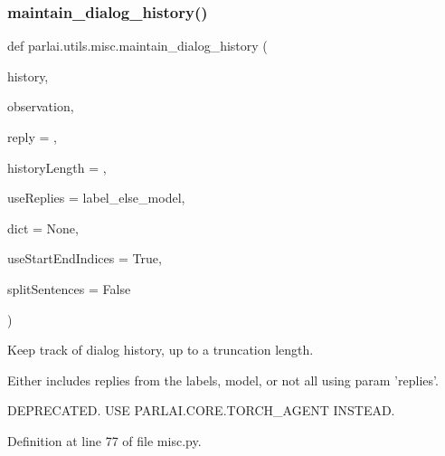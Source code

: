 \subsubsection{\texorpdfstring{maintain\+\_\+dialog\+\_\+history()}{maintain\_dialog\_history()}}
{\footnotesize\ttfamily def parlai.\+utils.\+misc.\+maintain\+\_\+dialog\+\_\+history (\begin{DoxyParamCaption}\item[{}]{history,  }\item[{}]{observation,  }\item[{}]{reply = {\ttfamily \textquotesingle{}\textquotesingle{}},  }\item[{}]{history\+Length = {},  }\item[{}]{use\+Replies = {\ttfamily \textquotesingle{}label\+\_\+else\+\_\+model\textquotesingle{}},  }\item[{}]{dict = {\ttfamily None},  }\item[{}]{use\+Start\+End\+Indices = {\ttfamily True},  }\item[{}]{split\+Sentences = {\ttfamily False} }\end{DoxyParamCaption})}

\begin{DoxyVerb}Keep track of dialog history, up to a truncation length.

Either includes replies from the labels, model, or not all using param
'replies'.

DEPRECATED. USE PARLAI.CORE.TORCH_AGENT INSTEAD.
\end{DoxyVerb}
 

Definition at line 77 of file misc.\+py.


